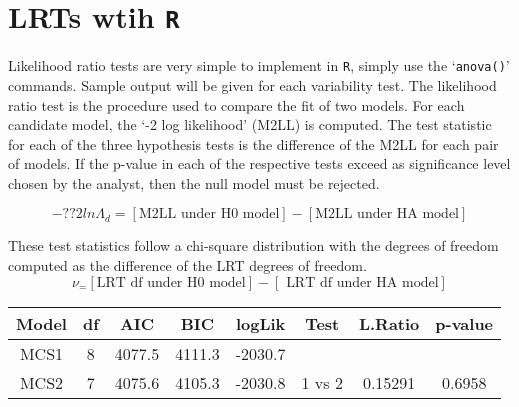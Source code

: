 \documentclass[12pt, a4paper]{report}
\theoremstyle{plain}
\theoremstyle{definition}
\theoremstyle{remark}
\begin{document}

\section{LRTs wtih \texttt{R}}
Likelihood ratio tests are very simple to implement in \texttt{R}, simply use the `\texttt{anova()}'
commands. Sample output will be given for each variability test. The likelihood ratio
test is the procedure used to compare the fit of two models. For each candidate model,
the `-2 log likelihood' (M2LL) is computed. The test statistic for each of the three
hypothesis tests is the difference of the M2LL for each pair of models. If the p-value
in each of the respective tests exceed as significance level chosen by the analyst, then
the null model must be rejected.

\begin{equation}
-??2 ln \Lambda_d = [\mbox{M2LL under H0 model}] - [\mbox{M2LL under HA model}] 
\end{equation}

These test statistics follow a chi-square distribution with the degrees of freedom
computed as the difference of the LRT degrees of freedom.
\begin{equation}	
\nu_ = [ \mbox{LRT df under H0 model}] - [\mbox{ LRT df under HA model}]
\end{equation}	

%	
%	
%		
\begin{center}
	\begin{tabular}{|c|c|c|c|c|c|c|c|}
		\hline
		Model   &      df &   AIC  & BIC      & logLik & Test & L.Ratio & p-value \\ \hline
		MCS1    &       8 & 4077.5 & 4111.3 & -2030.7  &       &         &        \\ \hline
		MCS2    &       7 & 4075.6 & 4105.3 & -2030.8  & 1 vs 2 & 0.15291 & 0.6958 \\
		\hline 
	\end{tabular} 
\end{center}
\end{document}
